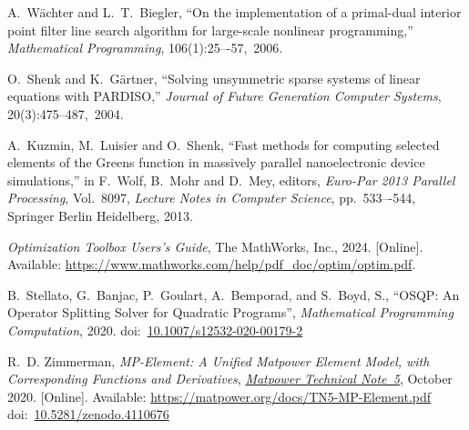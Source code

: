 \documentclass[12pt]{article}
\newcommand{\matpower}[0]{{\sc Matpower}}
\newcommand{\mpe}{{MP-Element}}
\newcommand{\TNfiveurl}[0]{https://matpower.org/docs/TN5-MP-Element.pdf}
\newcommand{\TNfive}[0]{\href{\TNfiveurl}{\it \matpower{} Technical Note~5}}
\newcommand{\doi}[1]{doi:~\href{https://doi.org/#1}{#1}}
\numberwithin{equation}{section}
\numberwithin{table}{section}
\numberwithin{figure}{section}
\begin{document}
\begin{thebibliography}{99}
A.~W\"achter and L.~T.~Biegler, ``On the implementation of a primal-dual interior point filter line search algorithm for large-scale nonlinear programming,'' \emph{Mathematical Programming}, 106(1):25–-57,~2006.

O.~Shenk and K.~G\"artner, ``Solving unsymmetric sparse systems of linear equations with PARDISO,'' \emph{Journal of Future Generation Computer Systems}, 20(3):475--487,~2004.

A.~Kuzmin, M.~Luisier and O.~Shenk, ``Fast methods for computing selected elements of the Greens function in massively parallel nanoelectronic device simulations,'' in F.~Wolf, B.~Mohr and D.~Mey, editors, \emph{Euro-Par 2013 Parallel Processing}, Vol.~8097, \emph{Lecture Notes in Computer Science}, pp.~533–-544, Springer Berlin Heidelberg, 2013.

\emph{Optimization Toolbox Users's Guide}, The MathWorks, Inc., 2024.
  [Online]. Available: \url{https://www.mathworks.com/help/pdf_doc/optim/optim.pdf}.

B.~Stellato, G.~Banjac, P.~Goulart, A.~Bemporad, and S.~Boyd, S., ``{OSQP}: An Operator Splitting Solver for Quadratic Programs'', \emph{Mathematical Programming Computation}, 2020.
doi:~\href{https://doi.org/10.1007/s12532-020-00179-2}{10.1007/s12532-020-00179-2}

R.~D. Zimmerman, \emph{\mpe{}: A Unified \matpower{} Element Model, with Corresponding Functions and Derivatives}, \TNfive, October 2020. [Online]. Available: \url{\TNfiveurl}
\doi{10.5281/zenodo.4110676}


\end{thebibliography}
\end{document}
